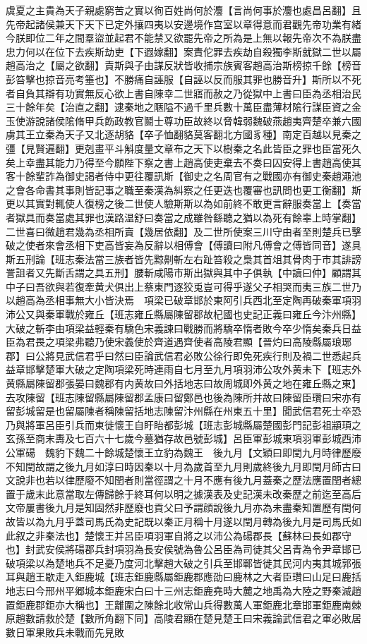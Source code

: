 虞夏之主貴為天子親處窮苦之實以徇百姓尚何於灋【言尚何事於灋也處昌呂翻】且先帝起諸侯兼天下天下已定外攘四夷以安邊境作宫室以章得意而君觀先帝功業有緒今朕即位二年之間羣盜並起君不能禁又欲罷先帝之所為是上無以報先帝次不為朕盡忠力何以在位下去疾斯劫吏【下遐嫁翻】案責佗罪去疾劫自殺獨李斯就獄二世以屬趙高治之【屬之欲翻】責斯與子由謀反狀皆收捕宗族賓客趙高治斯榜掠千餘【榜音彭笞擊也掠音亮考箠也】不勝痛自誣服【自誣以反而服其罪也勝音升】斯所以不死者自負其辯有功實無反心欲上書自陳幸二世寤而赦之乃從獄中上書曰臣為丞相治民三十餘年矣【治直之翻】逮秦地之陿隘不過千里兵數十萬臣盡薄材隂行謀臣資之金玉使游說諸侯隂脩甲兵飭政教官鬬士尊功臣故終以脅韓弱魏破燕趙夷齊楚卒兼六國虜其王立秦為天子又北逐胡貉【卒子恤翻貉莫客翻北方國豸種】南定百越以見秦之彊【見賢遍翻】更剋畫平斗斛度量文章布之天下以樹秦之名此皆臣之罪也臣當死久矣上幸盡其能力乃得至今願陛下察之書上趙高使吏棄去不奏曰囚安得上書趙高使其客十餘輩詐為御史謁者侍中更往覆訊斯【御史之名周官有之戰國亦有御史秦趙澠池之會各命書其事則皆記事之職至秦漢為糾察之任更迭也覆審也訊問也更工衡翻】斯更以其實對輒使人復榜之後二世使人驗斯斯以為如前終不敢更言辭服奏當上【奏當者獄具而奏當處其罪也漢路温舒曰奏當之成雖咎繇聽之猶以為死有餘辜上時掌翻】二世喜曰微趙君幾為丞相所賣【幾居依翻】及二世所使案三川守由者至則楚兵已擊破之使者來會丞相下吏高皆妄為反辭以相傅會【傅讀曰附凡傅會之傅皆同音】遂具斯五刑論【班志秦法當三族者皆先黥劓斬左右趾笞殺之梟其首俎其骨肉于市其誹謗詈詛者又先斷舌謂之具五刑】腰斬咸陽市斯出獄與其中子俱執【中讀曰仲】顧謂其中子曰吾欲與若復牽黄犬俱出上蔡東門逐狡兎豈可得乎遂父子相哭而夷三族二世乃以趙高為丞相事無大小皆決焉　項梁已破章邯於東阿引兵西北至定陶再破秦軍項羽沛公又與秦軍戰於雍丘【班志雍丘縣屬陳留郡故杞國也史記正義曰雍丘今汴州縣】大破之斬李由項梁益輕秦有驕色宋義諫曰戰勝而將驕卒惰者敗今卒少惰矣秦兵日益臣為君畏之項梁弗聽乃使宋義使於齊道遇齊使者高陵君顯【晉灼曰高陵縣屬琅琊郡】曰公將見武信君乎曰然曰臣論武信君必敗公徐行即免死疾行則及禍二世悉起兵益章邯擊楚軍大破之定陶項梁死時連雨自七月至九月項羽沛公攻外黄未下【班志外黄縣屬陳留郡張晏曰魏郡有内黄故曰外括地志曰故周城即外黄之地在雍丘縣之東】去攻陳留【班志陳留縣屬陳留郡孟康曰留鄭邑也後為陳所并故曰陳留臣瓚曰宋亦有留彭城留是也留屬陳者稱陳留括地志陳留汴州縣在州東五十里】聞武信君死士卒恐乃與將軍呂臣引兵而東徙懷王自盱眙都彭城【班志彭城縣屬楚國彭門記彭祖顓頊之玄孫至商末夀及七百六十七歲今墓猶存故邑號彭城】呂臣軍彭城東項羽軍彭城西沛公軍碭　魏豹下魏二十餘城楚懷王立豹為魏王　後九月【文穎曰即閏九月時律歷廢不知閏故謂之後九月如淳曰時因秦以十月為歲首至九月則歲終後九月即閏月師古曰文說非也若以律歷廢不知閏者則當徑謂之十月不應有後九月蓋秦之歷法應置閏者總置于歲末此意當取左傳歸餘于終耳何以明之據漢表及史記漢未改秦歷之前迄至高后文帝屢書後九月是知固然非歷廢也貢父曰予謂顔說後九月亦為未盡秦知置歷有閏何故皆以為九月乎蓋司馬氏為史記既以秦正月稱十月遂以閏月轉為後九月是司馬氏如此叙之非秦法也】楚懷王并呂臣項羽軍自將之以沛公為碭郡長【蘇林曰長如郡守也】封武安侯將碭郡兵封項羽為長安侯號為魯公呂臣為司徒其父呂青為令尹章邯已破項梁以為楚地兵不足憂乃度河北擊趙大破之引兵至邯鄲皆徙其民河内夷其城郭張耳與趙王歇走入鉅鹿城【班志鉅鹿縣屬鉅鹿郡應劭曰鹿林之大者臣瓚曰山足曰鹿括地志曰今邢州平郷城本鉅鹿宋白曰十三州志鉅鹿堯時大麓之地禹為大陸之野秦滅趙置鉅鹿郡鉅亦大稱也】王離圍之陳餘北收常山兵得數萬人軍鉅鹿北章邯軍鉅鹿南棘原趙數請救於楚【數所角翻下同】高陵君顯在楚見楚王曰宋義論武信君之軍必敗居數日軍果敗兵未戰而先見敗